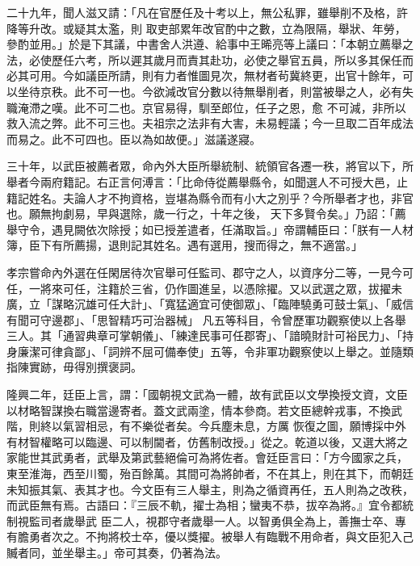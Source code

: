 \begin{pinyinscope}
 二十九年，聞人滋又請：「凡在官歷任及十考以上，無公私罪，雖舉削不及格，許降等升改。或疑其太濫，則
 取吏部累年改官酌中之數，立為限隔，舉狀、年勞，參酌並用。」於是下其議，中書舍人洪遵、給事中王晞亮等上議曰：「本朝立薦舉之法，必使歷任六考，所以遲其歲月而責其赴功，必使之舉官五員，所以多其保任而必其可用。今如議臣所請，則有力者惟圖見次，無材者茍冀終更，出官十餘年，可以坐待京秩。此不可一也。今欲減改官分數以待無舉削者，則當被舉之人，必有失職淹滯之嘆。此不可二也。京官易得，馴至郎位，任子之恩，愈
 不可減，非所以救入流之弊。此不可三也。夫祖宗之法非有大害，未易輕議；今一旦取二百年成法而易之。此不可四也。臣以為如故便。」滋議遂寢。



 三十年，以武臣被薦者眾，命內外大臣所舉統制、統領官各遷一秩，將官以下，所舉者今兩府籍記。右正言何溥言：「比命侍從薦舉縣令，如聞選人不可授大邑，止籍記姓名。夫論人才不拘資格，豈堪為縣令而有小大之別乎？今所舉者才也，非官也。願無拘劇易，早與選除，歲一行之，十年之後，
 天下多賢令矣。」乃詔：「薦舉守令，遇見闕依次除授；如已授差遣者，任滿取旨。」帝謂輔臣曰：「朕有一人材簿，臣下有所薦揚，退則記其姓名。遇有選用，搜而得之，無不適當。」



 孝宗嘗命內外選在任閑居待次官舉可任監司、郡守之人，以資序分二等，一見今可任，一將來可任，注籍於三省，仍作圖進呈，以憑除擢。又以武選之眾，拔擢未廣，立「謀略沉雄可任大計」、「寬猛適宜可使御眾」、「臨陣驍勇可鼓士氣」、「威信有聞可守邊郡」、「思智精巧可治器械」
 凡五等科目，令曾歷軍功觀察使以上各舉三人。其「通習典章可掌朝儀」、「練達民事可任郡寄」、「諳曉財計可裕民力」、「持身廉潔可律貪鄙」、「詞辨不屈可備奉使」五等，令非軍功觀察使以上舉之。並隨類指陳實跡，毋得別撰褒詞。



 隆興二年，廷臣上言，謂：「國朝視文武為一體，故有武臣以文學換授文資，文臣以材略智謀換右職當邊寄者。蓋文武兩塗，情本參商。若文臣總幹戎事，不換武階，則終以氣習相忌，有不樂從者矣。今兵塵未息，方厲
 恢復之圖，願博採中外有材智權略可以臨邊、可以制閫者，仿舊制改授。」從之。乾道以後，又選大將之家能世其武勇者，武舉及第武藝絕倫可為將佐者。會廷臣言曰：「方今國家之兵，東至淮海，西至川蜀，殆百餘萬。其間可為將帥者，不在其上，則在其下，而朝廷未知振其氣、表其才也。今文臣有三人舉主，則為之循資再任，五人則為之改秩，而武臣無有焉。古語曰：『三辰不軌，擢士為相；蠻夷不恭，拔卒為將。』宜令都統制視監司者歲舉武
 臣二人，視郡守者歲舉一人。以智勇俱全為上，善撫士卒、專有膽勇者次之。不拘將校士卒，優以獎擢。被舉人有臨戰不用命者，與文臣犯入己贓者同，並坐舉主。」帝可其奏，仍著為法。




\end{pinyinscope}
